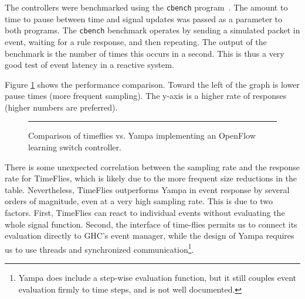 The controllers were benchmarked using the {\tt cbench} program~\cite{cbench}. The
amount to time to pause between time and signal updates was passed as a parameter to
both programs. The {\tt cbench} benchmark operates by sending a simulated packet in
event, waiting for a rule response, and then repeating. The output of the benchmark
is the number of times this occurs in a second. This is thus a very good test of
event latency in a reactive system.

Figure \ref{fig:timeflies-yampa-comparison} shows the performance comparison.
Toward the left of the graph is lower pause times (more frequent sampling). The
y-axis is a higher rate of responses (higher numbers are preferred). 

\begin{figure}
\hrule
\caption{Comparison of timeflies vs. Yampa implementing an OpenFlow learning switch controller.}
\label{fig:timeflies-yampa-comparison}
\end{figure}

There is some unexpected correlation between the sampling rate and the response rate
for TimeFlies, which is likely due to the more frequent size reductions in the table.
Nevertheless, TimeFlies outperforms Yampa in event response by several orders of magnitude,
even at a very high sampling rate. This is due to two factors. First, TimeFlies can react
to individual events without evaluating the whole signal function. Second, the
interface of time-flies permits us to connect its evaluation directly to GHC's event
manager, while the design of Yampa requires us to use threads and synchronized communication\footnote{Yampa does include a step-wise evaluation function, but it still couples event
evaluation firmly to time steps, and is not well documented.}.

